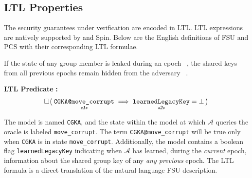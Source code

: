 \documentclass[runningheads]{llncs}
\newcommand{\Abrev}[1]{\gls{#1}}
\newcommand{\Adversary}{\ensuremath{\mathcal{A}}\xspace}
\begin{document}
\newcommand{\UnderNote}[1]{%
{\textit{\textsf{\guillemotleft#1\guillemotright}}}%
}
\newcommand{\UnderNoteRef}[1]{%
\,\raisebox{0.15em}{\scalebox{0.65}{\UnderNote{#1}}}%
}

\newcommand{\TermLTL}[1]{{\small{\texttt{#1}}}}


\subsection{LTL Properties}

The security guarantees under verification are encoded in \Abrev{LTL}.
\Abrev{LTL} expressions are natively supported by \Promela and Spin.
Below are the English definitions of \Abrev{FSU} and \Abrev{PCS} with their corresponding \Abrev{LTL} formulae.

\begin{definition}
If the state of any group member is leaked during an epoch\UnderNoteRef{1}, the shared keys from all previous epochs remain hidden from the adversary\UnderNoteRef{2}.
\end{definition}%
\noindent\textbf{LTL Predicate} \textbf{:}%
{\small%
\[%
\Box \big(\, \underset{\UnderNote{1}}{\texttt{CGKA@move\_corrupt}} \implies \underset{\UnderNote{2}}{\texttt{learnedLegacyKey}} = \bot \,\big)%
\]%
}

The \Promela model is named \TermLTL{CGKA}, and the state within the model at which \Adversary queries the oracle  \Oracle{corr}{\TermLTL{targetID}} is labeled \TermLTL{move\_corrupt}.
The term \TermLTL{CGKA@move\_corrupt} will be true only when \TermLTL{CGKA} is in state \TermLTL{move\_corrupt}.
Additionally, the model contains a boolean flag \TermLTL{learnedLegacyKey} indicating when \Adversary has learned, during the \emph{current} epoch, information about the shared group key of any \emph{any previous} epoch.
The \Abrev{LTL} formula  is a direct translation of the natural language \Abrev{FSU} description.
\end{document}
